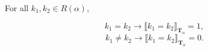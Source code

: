 For all $k_1, k_2 \in R(\alpha)$,

$$
k_1 = k_2 \to \llbracket k_1 = k_2 \rrbracket_{\mathbf{T}_{\alpha}} = 1,
$$
$$
k_1 \neq k_2 \to \llbracket k_1 = k_2 \rrbracket_{\mathbf{T}_{\alpha}} = 0.
$$
